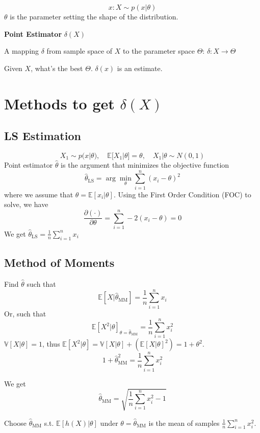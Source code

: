 \[ x : X \sim p(x|\theta) \]
$\theta$ is the parameter setting the shape of the distribution.

\begin{definition}
  \textbf{\color{blue}Point Estimator} $\delta(X)$
  
  A mapping $\delta$ from sample space of $X$ to the parameter space $\Theta$:
  $\delta : X \rightarrow \Theta$
  
  Given $X$, what's the best $\Theta$. $\delta(x)$ is an estimate.
\end{definition}

\section{Methods to get $\delta(X)$}

\subsection{LS Estimation}

\[ X_1 \sim p(x|\theta), \quad \mathbb{E}[X_1|\theta] = \theta, \quad X_1|\theta \sim N(0, 1) \]
Point estimator $\hat{\theta}$ is the argument that minimizes the objective function
\[ \hat{\theta}_{\text{LS}} = \arg \min_{\theta} \sum_{i=1}^n (x_i - \theta)^2 \]
where we assume that $\theta = \mathbb{E}[x_i|\theta]$. Using the First Order Condition (FOC) to solve, we have
\[ \frac{\partial (\cdot)}{\partial \theta} = \sum_{i=1}^n -2(x_i - \theta) = 0 \]
We get $\hat{\theta}_{\text{LS}} = \frac{1}{n} \sum_{i=1}^n x_i$

\subsection{Method of Moments}

Find $\hat{\theta}$ such that
\[ \mathbb{E}[X|\hat{\theta}_{\text{MM}}] = \frac{1}{n} \sum_{i=1}^n x_i \]
Or, such that
\[ \mathbb{E}[X^2|\theta]_{\theta = \hat{\theta}_{\text{MM}}} = \frac{1}{n} \sum_{i=1}^n x_i^2 \]
$\mathbb{V}[X|\theta] = 1$, thus $\mathbb{E}[X^2|\theta] = \mathbb{V}[X|\theta] + (\mathbb{E}[X|\theta]^2) = 1 + \theta^2$. 
\[ 1 + \hat{\theta}_{\text{MM}}^2 = \frac{1}{n} \sum_{i=1}^n x_i^2 \]

We get
\[ \hat{\theta}_{\text{MM}} = \sqrt{\frac{1}{n} \sum_{i=1}^n x_i^2 - 1} \]
\begin{note}
  Choose $\hat{\theta}_{\text{MM}}$ s.t. $\mathbb{E}[h(X)|\theta]$ under $\theta = \hat{\theta}_{\text{MM}}$ is the mean of samples $\frac{1}{n} \sum_{i=1}^n x_i^2$.
\end{note}

